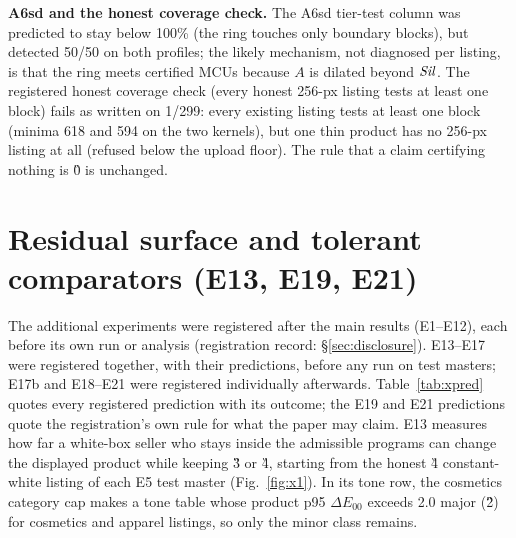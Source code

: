 \documentclass[10pt]{article}
\begin{document}
\textbf{A6sd and the honest coverage check.} The A6sd tier-test column was predicted to stay below 100\% (the ring
touches only boundary blocks), but \sys{} detected 50/50 on both profiles; the likely mechanism, not diagnosed per
listing, is that the ring meets certified MCUs because $A$ is dilated beyond $\mathit{Sil}$. The registered honest \tierT{}
coverage check (every honest 256-px listing tests at least one block) fails as written on 1/299: every existing listing
tests at least one block (minima 618 and 594 on the two kernels), but one thin product has no 256-px listing at all (refused below
the upload floor). The rule that a claim certifying nothing is \G{0} is unchanged.

\section{Residual surface and tolerant comparators (E13, E19, E21)}
\label{sec:e13}
\label{sec:x1}
\label{sec:additional}
The additional experiments were registered after the main results (E1--E12), each before its own run or analysis
(registration record: \S\ref{sec:disclosure}). E13--E17 were registered together, with their predictions, before any run on test
masters; E17b and E18--E21 were registered individually afterwards. Table~\ref{tab:xpred} quotes every registered prediction with its outcome; the E19 and E21
predictions quote the registration's own rule for what the paper may claim. E13 measures how far a white-box seller who
stays inside the admissible programs can change the displayed product while keeping \G{3} or \G{4}, starting from the
honest \G{4} constant-white listing of each E5 test master (Fig.~\ref{fig:x1}). In its tone row, the cosmetics
category cap makes a tone table whose product p95 $\Delta E_{00}$ exceeds 2.0 major (\G{2}) for cosmetics and apparel
listings, so only the minor class remains.
\end{document}
